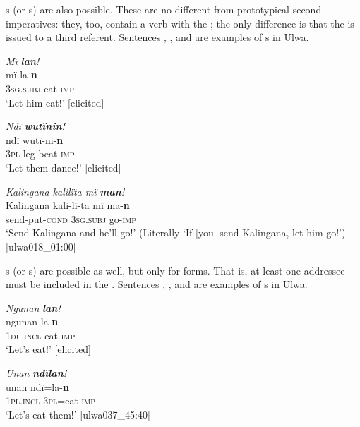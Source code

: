 s (or s) are also possible. These are no different from prototypical second  imperatives: they, too, contain a verb with the  ; the only difference is that the  is issued to a third  referent. Sentences , , and  are examples of s in Ulwa.

\ea%
    \label{ex:syntax:75}
          \textit{Mï} \textbf{\textit{lan}}\textit{!}\\
\gll    mï      la{}-\textbf{n}\\
    \textsc{3sg.subj}  eat-\textsc{imp}\\
\glt `Let him eat!’ [elicited]
\z

\ea%
    \label{ex:syntax:76}
          \textit{Ndï} \textbf{\textit{wutïnin}}\textit{!}\\
\gll    ndï  wutï-ni-\textbf{n}\\
    \textsc{3pl}  leg-beat-\textsc{imp}\\
\glt `Let them dance!’  [elicited]
\z

\ea%
    \label{ex:syntax:77}
          \textit{Kalingana kalilïta mï} \textbf{\textit{man}}\textit{!}\\
\gll    Kalingana  kali-lï-ta      mï      ma-\textbf{n}\\
    [name]    send-put\textsc{{}-cond} 3\textsc{sg.subj}  go-\textsc{imp}\\
\glt `Send Kalingana and he’ll go!’ (Literally ‘If [you] send Kalingana, let him go!’) [ulwa018\_01:00]
\z

s (or s) are possible as well, but only for   forms. That is, at least one addressee must be included in the . Sentences , , and  are examples of s in Ulwa.

\ea%
    \label{ex:syntax:78}
          \textit{Ngunan} \textbf{\textit{lan}}\textit{!}\\
\gll ngunan    la{}-\textbf{n}\\
    1\textsc{du.incl}  eat-\textsc{imp}\\
\glt `Let’s eat!’ [elicited]
\z

\ea%
    \label{ex:syntax:79}
          \textit{Unan} \textbf{\textit{ndïlan}}\textit{!}\\
\gll    unan    ndï=la-\textbf{n}\\
    1\textsc{pl.incl}  \textsc{3pl}=eat-\textsc{imp}\\
\glt `Let’s eat them!’ [ulwa037\_45:40]
\z

